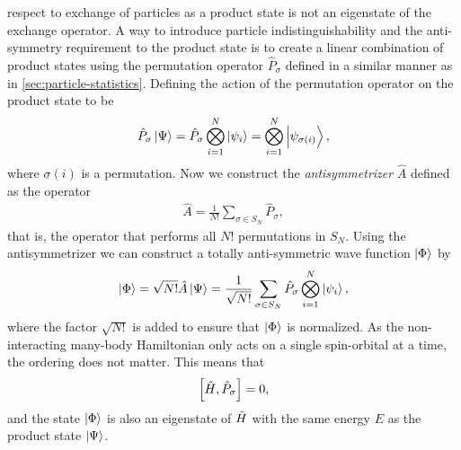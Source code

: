         respect to exchange of particles as a product state is not an eigenstate
        of the exchange operator.
        A way to introduce particle indistinguishability and the anti-symmetry
        requirement to the product state is to create a linear combination of
        product states using the permutation operator $\hat{P}_{\sigma}$ defined
        in a similar manner as in \autoref{sec:particle-statistics}.
        Defining the action of the permutation operator on the product state to
        be
        \begin{align}
            \hat{P}_{\sigma}\ket{\Psi}
            = \hat{P}_{\sigma}\bigotimes_{i = 1}^{N}\ket{\psi_i}
            = \bigotimes_{i = 1}^{N}\ket{\psi_{\sigma(i)}},
        \end{align}
        where $\sigma(i)$ is a permutation.
        Now we construct the \emph{antisymmetrizer} $\hat{A}$ defined as the
        operator
        \begin{align}
            \hat{A} = \frac{1}{N!}\sum_{\sigma \in S_{N}}\hat{P}_{\sigma},
        \end{align}
        that is, the operator that performs all $N!$ permutations in $S_{N}$.
        Using the antisymmetrizer we can construct a totally anti-symmetric wave
        function $\ket{\Phi}$ by
        \begin{align}
            \ket{\Phi}
            = \sqrt{N!}\hat{A}\ket{\Psi}
            = \frac{1}{\sqrt{N!}}\sum_{\sigma \in S_{N}}
            \hat{P}_{\sigma}
            \bigotimes_{i = 1}^{N}\ket{\psi_i},
        \end{align}
        where the factor $\sqrt{N!}$ is added to ensure that $\ket{\Phi}$ is
        normalized.
        As the non-interacting many-body Hamiltonian only acts on a single
        spin-orbital at a time, the ordering does not matter.
        This means that
        \begin{align}
            \left[\hat{H}, \hat{P}_{\sigma}\right] = 0,
        \end{align}
        and the state $\ket{\Phi}$ is also an eigenstate of $\hat{H}$ with the
        same energy $E$ as the product state $\ket{\Psi}$.


